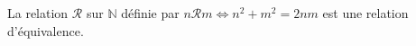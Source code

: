 La relation $\mathcal R$ sur $\mathbb N$ définie par $n\mathcal R m \iff n^2+m^2 = 2nm$ est une relation d'équivalence.

\begin{reponses}
\end{reponses}

